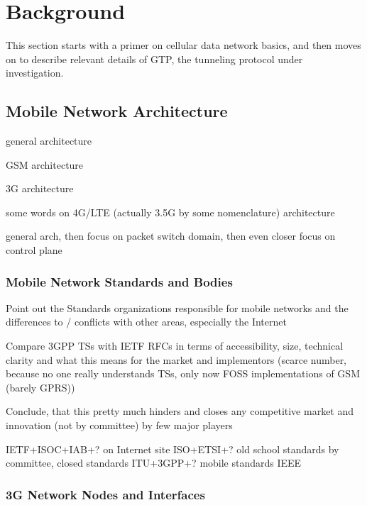 \section{Background}
\label{c4:background}

This section starts with a primer on cellular data network basics, and then moves on to describe relevant details of \gls{GTP}, the tunneling protocol under investigation.

\subsection{Mobile Network Architecture}
\label{sec:3gpparchitecture}


general architecture

GSM architecture

3G architecture

some words on 4G/LTE (actually 3.5G by some nomenclature)  architecture


general arch, then focus on packet switch domain, then even closer focus on control plane

\subsubsection{Mobile Network Standards and Bodies}

Point out the Standards organizations responsible for mobile networks and the differences to / conflicts with other areas, especially the Internet

Compare \gls{3GPP} \glspl{TS} with \gls{IETF} \glspl{RFC} in terms of accessibility, size, technical clarity and what this means for the market and implementors (scarce number, because no one really understands TSs, only now \gls{FOSS} implementations of \gls{GSM} (barely \gls{GPRS}))

Conclude, that this pretty much hinders and closes any competitive market and innovation (not by committee) by few major players

\gls{IETF}+\gls{ISOC}+\gls{IAB}+? on Internet site
\gls{ISO}+\gls{ETSI}+? old school standards by committee, closed standards
\gls{ITU}+\gls{3GPP}+? mobile standards
\gls{IEEE}

\subsubsection{3G Network Nodes and Interfaces}



